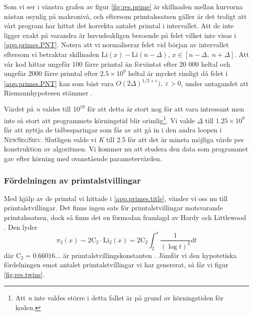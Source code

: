 Som vi ser i vänstra grafen av figur \ref{fig:res.prime} är skillnaden mellan kurvorna nästan osynlig på makronivå, och eftersom primtalssatsen gäller är det troligt att vårt program har hittat det korrekta antalet primtal i intervallet.
Att de inte ligger exakt på varandra är huvudsakligen beroende på felet vilket inte visas i \eqref{app.primes.PNT}.
Notera att vi normaliserar felet vid början av intervallet eftersom vi betraktar skillnaden \(\text{Li}(x) - \text{Li}(n - \Delta)\), \(x\in[n-\Delta,\; n+\Delta]\).
Att vår kod hittar ungefär 100 färre primtal än förväntat efter 20 000 heltal och ungefär 2000 färre primtal efter \(2.5\times10^9\) heltal är mycket rimligt då felet i \eqref{app.primes.PNT} kan som bäst vara \(O(2\Delta)^{1/2 + \varepsilon}),\; \varepsilon > 0\), under antagandet att Riemannhypotesen stämmer \cite[kap. 5]{RiemannErr}.

Värdet på \textit{n} valdes till \(10^{19}\) för att detta är stort nog för att vara intressant men inte så stort att programmets körningstid blir orimlig\footnote{Att \textit{n} inte valdes större i detta fallet är på grund av körningstiden för koden.}.
Vi valde \(\Delta\) till \(1.25\times10^9\) får att nyttja de tidbesparingar som fås av att gå in i den andra loopen i \textsc{NewSegSiev}.
Slutligen valde  vi \textit{K} till 2.5 för att det är minsta möjliga värde per konstruktion av algoritmen.
Vi kommer nu att studera den data som programmet gav efter körning med ovanstående parametervärden.

\subsubsection{Fördelningen av primtalstvillingar}

Med hjälp av de primtal vi hittade i \ref{app.primes.title}, vänder vi oss nu till primtalstvillingar. Det finns ingen sats för primtalstvillingar motsvarande primtalssatsen, dock så finns det en förmodan framlagd av Hardy och Littlewood \cite[Förmodan B]{Hardy}. 
Den lyder
\begin{equation}
    \pi_2(x) \sim 2\text{C}_2\cdot \text{Li}_2(x) = 2\text{C}_2\int_2^x\frac{1}{(\log t)^2}dt\label{app.twins.TWN}
\end{equation}
där \(\text{C}_2 = 0.66016...\) är primtalstvillingskonstanten \cite{TwinPrimeConstant}. Jämför vi den hypotetiska fördelningen emot antalet primtalstvillingar vi har genererat, så får vi figur \ref{fig:res.twins}.

